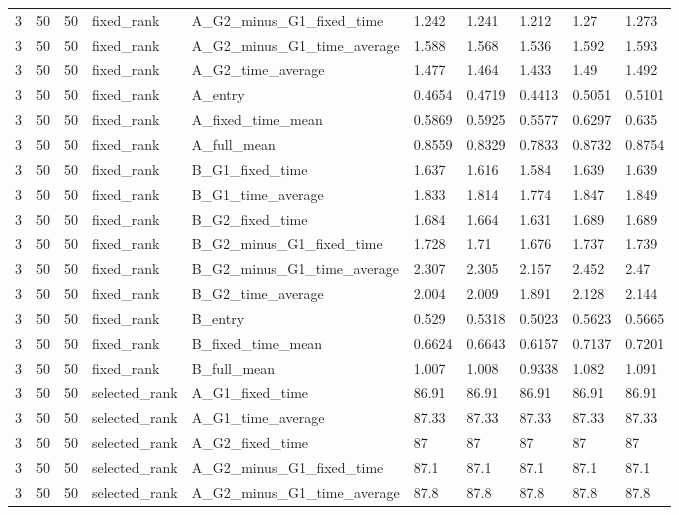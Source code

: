 \begin{longtable}{llllllllll}
3 & 50 & 50 & fixed\_rank & A\_G2\_minus\_G1\_fixed\_time & 1.242 & 1.241 & 1.212 & 1.27 & 1.273 \\
3 & 50 & 50 & fixed\_rank & A\_G2\_minus\_G1\_time\_average & 1.588 & 1.568 & 1.536 & 1.592 & 1.593 \\
3 & 50 & 50 & fixed\_rank & A\_G2\_time\_average & 1.477 & 1.464 & 1.433 & 1.49 & 1.492 \\
3 & 50 & 50 & fixed\_rank & A\_entry & 0.4654 & 0.4719 & 0.4413 & 0.5051 & 0.5101 \\
3 & 50 & 50 & fixed\_rank & A\_fixed\_time\_mean & 0.5869 & 0.5925 & 0.5577 & 0.6297 & 0.635 \\
3 & 50 & 50 & fixed\_rank & A\_full\_mean & 0.8559 & 0.8329 & 0.7833 & 0.8732 & 0.8754 \\
3 & 50 & 50 & fixed\_rank & B\_G1\_fixed\_time & 1.637 & 1.616 & 1.584 & 1.639 & 1.639 \\
3 & 50 & 50 & fixed\_rank & B\_G1\_time\_average & 1.833 & 1.814 & 1.774 & 1.847 & 1.849 \\
3 & 50 & 50 & fixed\_rank & B\_G2\_fixed\_time & 1.684 & 1.664 & 1.631 & 1.689 & 1.689 \\
3 & 50 & 50 & fixed\_rank & B\_G2\_minus\_G1\_fixed\_time & 1.728 & 1.71 & 1.676 & 1.737 & 1.739 \\
3 & 50 & 50 & fixed\_rank & B\_G2\_minus\_G1\_time\_average & 2.307 & 2.305 & 2.157 & 2.452 & 2.47 \\
3 & 50 & 50 & fixed\_rank & B\_G2\_time\_average & 2.004 & 2.009 & 1.891 & 2.128 & 2.144 \\
3 & 50 & 50 & fixed\_rank & B\_entry & 0.529 & 0.5318 & 0.5023 & 0.5623 & 0.5665 \\
3 & 50 & 50 & fixed\_rank & B\_fixed\_time\_mean & 0.6624 & 0.6643 & 0.6157 & 0.7137 & 0.7201 \\
3 & 50 & 50 & fixed\_rank & B\_full\_mean & 1.007 & 1.008 & 0.9338 & 1.082 & 1.091 \\
3 & 50 & 50 & selected\_rank & A\_G1\_fixed\_time & 86.91 & 86.91 & 86.91 & 86.91 & 86.91 \\
3 & 50 & 50 & selected\_rank & A\_G1\_time\_average & 87.33 & 87.33 & 87.33 & 87.33 & 87.33 \\
3 & 50 & 50 & selected\_rank & A\_G2\_fixed\_time & 87 & 87 & 87 & 87 & 87 \\
3 & 50 & 50 & selected\_rank & A\_G2\_minus\_G1\_fixed\_time & 87.1 & 87.1 & 87.1 & 87.1 & 87.1 \\
3 & 50 & 50 & selected\_rank & A\_G2\_minus\_G1\_time\_average & 87.8 & 87.8 & 87.8 & 87.8 & 87.8 \\

\end{longtable}
